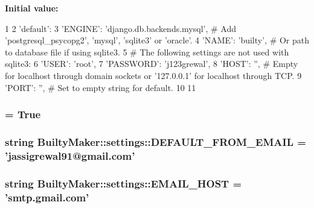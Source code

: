 {\bfseries \-Initial value\-:}
\begin{DoxyCode}
1 {
2     'default': {
3         'ENGINE': 'django.db.backends.mysql', # Add 'postgresql_psycopg2',
       'mysql', 'sqlite3' or 'oracle'.
4         'NAME': 'builty',                      # Or path to database file if
       using sqlite3.
5         # The following settings are not used with sqlite3:
6         'USER': 'root',
7         'PASSWORD': 'j123grewal',
8         'HOST': '',                # Empty for localhost through domain sockets
       or '127.0.0.1' for localhost through TCP.
9         'PORT': '',                      # Set to empty string for default.
10     }
11 }
\end{DoxyCode}
\hypertarget{namespaceBuiltyMaker_1_1settings_a3a883c51d660b16217fd04e4adc616b2}{
\subsubsection[{\-D\-E\-B\-U\-G}]{ = \-True}}\label{namespaceBuiltyMaker_1_1settings_a3a883c51d660b16217fd04e4adc616b2}
\hypertarget{namespaceBuiltyMaker_1_1settings_aec414246667020abefe1a622a4d0d6cf}{
\subsubsection[{\-D\-E\-F\-A\-U\-L\-T\-\_\-\-F\-R\-O\-M\-\_\-\-E\-M\-A\-I\-L}]{\setlength{\rightskip}{0pt plus 5cm}string {\bf \-Builty\-Maker\-::settings\-::\-D\-E\-F\-A\-U\-L\-T\-\_\-\-F\-R\-O\-M\-\_\-\-E\-M\-A\-I\-L} = 'jassigrewal91@gmail.\-com'}}\label{namespaceBuiltyMaker_1_1settings_aec414246667020abefe1a622a4d0d6cf}
\hypertarget{namespaceBuiltyMaker_1_1settings_ac7229d3be25e7aec93c3e0ff55f24e94}{
\subsubsection[{\-E\-M\-A\-I\-L\-\_\-\-H\-O\-S\-T}]{\setlength{\rightskip}{0pt plus 5cm}string {\bf \-Builty\-Maker\-::settings\-::\-E\-M\-A\-I\-L\-\_\-\-H\-O\-S\-T} = 'smtp.\-gmail.\-com'}}\label{namespaceBuiltyMaker_1_1settings_ac7229d3be25e7aec93c3e0ff55f24e94}
